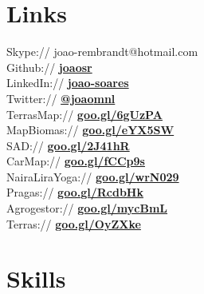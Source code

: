 \documentclass[]{joaosoares-resume}
\begin{document}
\begin{minipage}[t]{0.35\textwidth}
\section{Links} 
Skype:// joao-rembrandt@hotmail.com \\
Github:// \href{https://github.com/joaosr}{\bf joaosr} \\
LinkedIn://  \href{https://www.linkedin.com/in/joao-soares}{\bf joao-soares} \\
Twitter://  \href{https://twitter.com/joao_mnl}{\bf @joao\underline{\hspace{.10in}}mnl}\\
\sectionsep
{}
TerrasMap:// \href{https://goo.gl/6gUzPA}{\bf goo.gl/6gUzPA} \\
MapBiomas:// \href{https://goo.gl/eYX5SW}{\bf goo.gl/eYX5SW} \\
SAD:// \href{https://goo.gl/2J41hR}{\bf goo.gl/2J41hR} \\
CarMap:// \href{https://goo.gl/fCCp9s}{\bf goo.gl/fCCp9s}\\
NairaLiraYoga:// \href{https://goo.gl/wrN029}{\bf goo.gl/wrN029}\\
\sectionsep
{}
Pragas:// \href{https://goo.gl/RcdbHk}{\bf goo.gl/RcdbHk}\\
Agrogestor:// \href{https://goo.gl/mycBmL}{\bf goo.gl/mycBmL}\\
Terras:// \href{https://goo.gl/OyZXke}{\bf goo.gl/OyZXke}\\
\sectionsep




\section{Skills}


\end{minipage}
\end{document}
